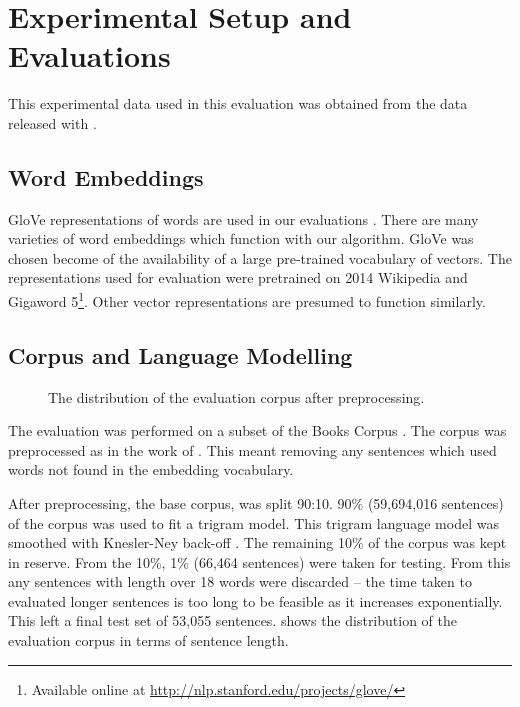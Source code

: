 \documentclass[11pt]{article}
\theoremstyle{plain}
\theoremstyle{definition}
\newcommand{\parencite}{\protect\cite}
\newcommand{\textcite}{\protect\newcite}
\begin{document}




\section{Experimental Setup and Evaluations} \label{evalsettings}
This experimental data used in this evaluation was
obtained from the data released with \textcite{White2015BOWgen}. 
\subsection{Word Embeddings}
GloVe representations of words are used in our evaluations \parencite{pennington2014glove}. There are many varieties of word embeddings which function with our algorithm. GloVe was chosen become of the availability of a large pre-trained vocabulary of vectors. The representations used for evaluation were pretrained on 2014 Wikipedia and Gigaword 5\footnote{Available online at \url{http://nlp.stanford.edu/projects/glove/}}.  Other vector representations are presumed to function similarly.

\subsection{Corpus and Language Modelling}
\begin{figure}
	\caption{\label{fig:corpus} The distribution of the evaluation corpus after preprocessing.}
\end{figure}

The evaluation was performed on a subset of the Books Corpus \parencite{moviebook}. The corpus was preprocessed as in the work of \textcite{White2015BOWgen}. This meant removing any sentences which used words not found in the embedding vocabulary.

After preprocessing, the base corpus, was split 90:10. 90\% (59,694,016 sentences) of the corpus was used to fit a trigram model. This trigram language model was smoothed with Knesler-Ney back-off \parencite{kneser1995improved}. The remaining 10\% of the corpus was kept in reserve. From the 10\%, 1\% (66,464 sentences) were taken for testing. From this any sentences with length over 18 words were discarded -- the time taken to evaluated longer sentences is too long to be feasible as it increases exponentially. This left a final test set of 53,055 sentences.  shows the distribution of the evaluation corpus in terms of sentence length.
 
\end{document}
